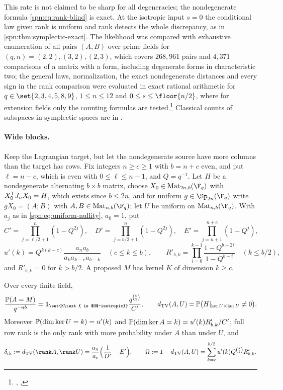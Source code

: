 This rate is not claimed to be sharp for all degeneracies; the nondegenerate formula
\eqref{spn:eq:rank-blind} is exact. At the isotropic input $s=0$ the conditional law given
rank is uniform and rank detects the whole discrepancy, as in
\cref{spn:thm:symplectic-exact}. The likelihood was compared with exhaustive enumeration of all pairs $(A,B)$
over prime fields for $(q,n)=(2,2),(3,2),(2,3)$, which covers $268{,}961$ pairs and $4{,}371$
comparisons of a matrix with a form, including degenerate forms in characteristic two; the
general laws, normalization, the exact nondegenerate distances and every sign in the rank
comparison were evaluated in exact rational arithmetic for $q\in\set{2,3,4,5,8,9}$,
$1\le n\le12$ and $0\le s\le\floor{n/2}$, where for extension fields only the counting
formulas are
tested.\footnote{\raggedright{},
,
}
Classical counts of subspaces in symplectic spaces are in
\cite{Wan1993Anzahl,GuoLiWang2013Anzahl}.

\paragraph{Wide blocks.}
Keep the Lagrangian target, but let the nondegenerate source have more columns than the target has
rows. Fix integers $n\ge c\ge1$ with $b=n+c$ even, and put $\ell=n-c$, which is even with
$0\le\ell\le n-1$, and $Q=q^{-1}$. Let $H$ be a nondegenerate alternating $b\times b$ matrix, choose
$X_0\in\spnMat_{2n,b}(\F_q)$ with $X_0^{\mathsf{T}}J_nX_0=H$, which exists since $b\le2n$, and for uniform
$g\in\Sp_{2n}(\F_q)$ write $gX_0=(A;B)$ with $A,B\in\spnMat_{n,b}(\F_q)$; let $U$ be uniform on
$\spnMat_{n,b}(\F_q)$. With $a_j$ as in \eqref{spn:eq:uniform-nullity}, $a_0=1$, put
\[
 C'=\prod_{j=\ell/2+1}^{n}(1-Q^{2j}),\quad D'=\prod_{j=b/2+1}^{n}(1-Q^{2j}),\quad
 E'=\prod_{j=n+1}^{n+c}(1-Q^j),
\]
\[
 u'(k)=Q^{k(k-c)}\frac{a_na_b}{a_ka_{k-c}a_{b-k}}\quad(c\le k\le b),\qquad
 R'_{b,k}=\prod_{i=0}^{k-1}\frac{1-Q^{b-2i}}{1-Q^{b-i}}\quad(k\le b/2),
\]
and $R'_{b,k}=0$ for $k>b/2$. A proposed $M$ has kernel $K$ of dimension $k\ge c$.

\begin{theorem}\label{spn:thm:wide}
Over every finite field,
\[
 \frac{\spnP(A=M)}{q^{-nb}}=\mathbf 1_{\set{K\text{ is $H$-isotropic}}}\frac{q^{\binom k2}}{C'},\qquad
 \spnTV(A,U)=\spnP\bigl(H|_{\ker U\times\ker U}\ne0\bigr).
\]
Moreover $\mathbb{P}(\dim\ker U=k)=u'(k)$ and $\mathbb{P}(\dim\ker A=k)=u'(k)R'_{b,k}/C'$; full row rank is the
only rank with more probability under $A$ than under $U$, and
\[
 \delta_{\mathrm{rk}}:=\spnTV(\rank A,\rank U)=\frac{a_n}{a_c}\Bigl(\frac1{D'}-E'\Bigr),\qquad
 \Omega:=1-\spnTV(A,U)=\sum_{k=c}^{b/2}u'(k)Q^{\binom k2}R'_{b,k}.
\]
\end{theorem}

